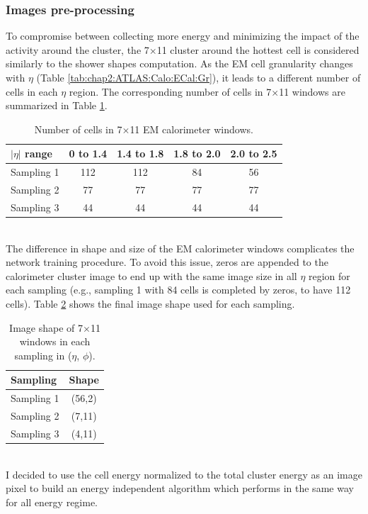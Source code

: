 \subsubsection{Images pre-processing}
\label{gamma:CNN:PreProcessing}
To compromise between collecting more energy and minimizing the impact of the activity around the cluster, the 7$\times$11 cluster around the hottest cell is considered similarly to the shower shapes computation. As the EM cell granularity changes with $\eta$ (Table \ref{tab:chap2:ATLAS:Calo:ECal:Gr}), it leads to a different number of cells in each $\eta$ region. The corresponding number of cells in 7$\times$11 windows are summarized in Table \ref{tab:gamma:CNN:PreProcessing:NCells}.
\begin{table}[htbp]
    \centering
    \begin{tabular}{lcccc}
    \hline\hline
        $|\eta|$ range & 0 to 1.4 & 1.4 to 1.8 & 1.8 to 2.0 & 2.0 to 2.5 \\
    \hline
        Sampling 1 & 112 & 112 & 84 & 56 \\
        Sampling 2 & 77 & 77 & 77 & 77 \\
        Sampling 3 & 44 & 44 & 44 & 44 \\
    \hline\hline
    \end{tabular}
    \caption{Number of cells in 7$\times$11 EM calorimeter windows.}
    \label{tab:gamma:CNN:PreProcessing:NCells}
\end{table}
\\
The difference in shape and size of the EM calorimeter windows complicates the network training procedure. To avoid this issue, zeros are appended to the calorimeter cluster image to end up with the same image size in all $\eta$ region for each sampling (e.g., sampling 1 with 84 cells is completed by zeros, to have 112 cells). Table \ref{tab:gamma:CNN:PreProcessing:ImgSize} shows the final image shape used for each sampling.
\begin{table}[htbp]
    \centering
    \begin{tabular}{lc}
    \hline\hline
        Sampling & Shape \\
    \hline
        Sampling 1 & (56,2)\\
        Sampling 2 & (7,11)  \\
        Sampling 3 & (4,11) \\
    \hline\hline
    \end{tabular}
    \caption{Image shape of 7$\times$11 windows in each sampling in ($\eta$, $\phi$).}
    \label{tab:gamma:CNN:PreProcessing:ImgSize}
\end{table}
\\
I decided to use the cell energy normalized to the total cluster energy as an image pixel to build an energy independent algorithm which performs in the same way for all energy regime.

